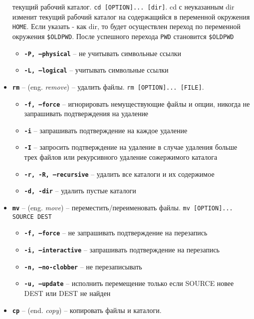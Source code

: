 \documentclass[12pt, a4paper]{article}
\begin{document}
\begin{itemize}
    текущий рабочий каталог. \texttt{cd [OPTION]... [dir]}. cd с неуказанным
    dir изменит текущий рабочий каталог на содержащийся в переменной окружения
    \texttt{HOME}. Если указать - как dir, то будет осуществлен переход по
    переменной окружения \texttt{\$OLDPWD}. После успешного перехода \texttt{PWD}
    становится \texttt{\$OLDPWD}
    \begin{itemize}
      \item \textbf{\texttt{-P, --physical}} -- не учитывать символьные ссылки
      \item \textbf{\texttt{-L, --logical}} -- учитывать символьные ссылки
    \end{itemize}
  \item \textbf{\texttt{rm}} -- (eng. \textit{remove}) -- удалить файлы.
    \texttt{rm [OPTION]... [FILE]}.
    \begin{itemize}
      \item \textbf{\texttt{-f, --force}} -- игнорировать немуществующие файлы
        и опции, никогда не запрашивать подтверждения на удаление
      \item \textbf{\texttt{-i}} -- запрашивать подтверждение на каждое удаление
      \item \textbf{\texttt{-I}} -- запросить подтверждение на удаление в случае
        удаления больше трех файлов или рекурсивного удаление сожержимого
        каталога
      \item \textbf{\texttt{-r, -R, --recursive}} -- удалить все каталоги и их
        содержимое
      \item \textbf{\texttt{-d, -dir}} -- удалить пустые каталоги
    \end{itemize}
  \item \textbf{\texttt{mv}} -- (eng. \textit{move}) -- переместить/переименовать
    файлы. \texttt{mv [OPTION]... SOURCE DEST}
    \begin{itemize}
      \item \textbf{\texttt{-f, --force}} -- не запрашивать подтверждение на
        перезапись
      \item \textbf{\texttt{-i, --interactive}} -- запрашивать подтверждение на
        перезапись
      \item \textbf{\texttt{-n, --no-clobber}} -- не перезаписывать
      \item \textbf{\texttt{-u, --update}} -- исполнить перемещение только если
        SOURCE новее DEST или DEST не найден
    \end{itemize}
  \item \textbf{\texttt{cp}} -- (end. \textit{copy}) -- копировать файлы и каталоги.

\end{itemize}
\end{document}
